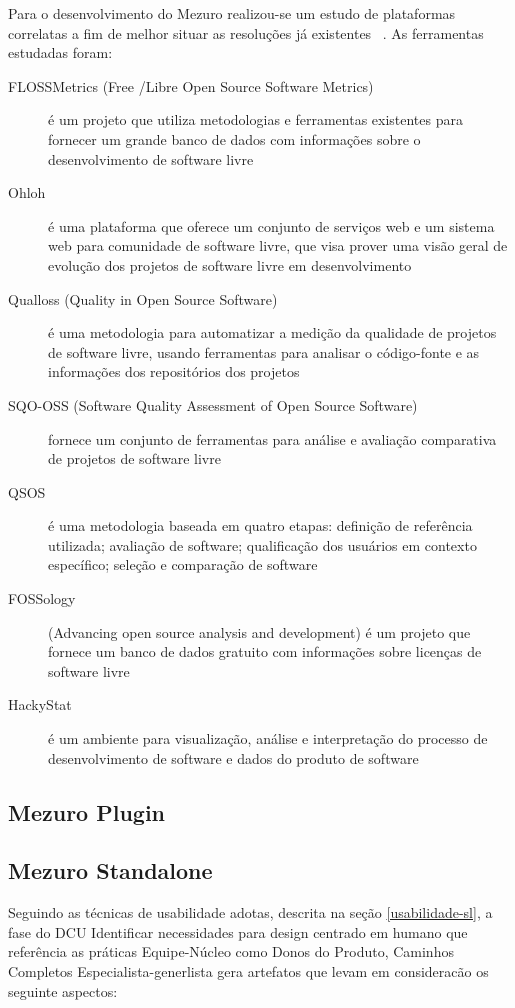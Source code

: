 Para o desenvolvimento do Mezuro realizou-se um estudo de plataformas correlatas a fim de melhor situar as resoluções já existentes~\cite{}%
. As ferramentas estudadas foram:

\begin{description}
\item[FLOSSMetrics (Free /Libre Open Source Software Metrics)]
é um projeto que utiliza metodologias e ferramentas existentes para fornecer um grande banco de dados com informações sobre o desenvolvimento de software livre
\item[Ohloh]
é uma plataforma que oferece um conjunto de serviços web e um sistema web para comunidade de software livre, que visa prover uma visão geral de evolução dos projetos de software livre em desenvolvimento
\item[Qualloss (Quality in Open Source Software)]
é uma metodologia para automatizar a medição da qualidade de projetos de software livre, usando ferramentas para analisar o código-fonte e as informações dos repositórios dos projetos
\item[SQO-OSS (Software Quality Assessment of Open Source Software)]
fornece um conjunto de ferramentas para análise e avaliação comparativa de projetos de software livre
\item[QSOS]
é uma metodologia baseada em quatro etapas: definição de referência utilizada; avaliação de software; qualificação dos usuários em contexto específico; seleção e comparação de software
\item[FOSSology]
(Advancing open source analysis and development) é um projeto que fornece um banco de dados gratuito com informações sobre licenças de software livre
\item[HackyStat]
é um ambiente para visualização, análise e interpretação do processo de desenvolvimento de software e dados do produto de software
\end{description}

\subsection{Mezuro Plugin}
\label{mezuro-plugin}

\subsection{Mezuro Standalone}
\label{mezuro-standalone}

Seguindo as técnicas de usabilidade adotas, descrita na seção \ref{usabilidade-sl}, a fase do DCU Identificar necessidades para design centrado em humano que referência as práticas Equipe-Núcleo como Donos do Produto, Caminhos Completos Especialista-generlista gera artefatos que levam em consideracão os seguinte aspectos:

